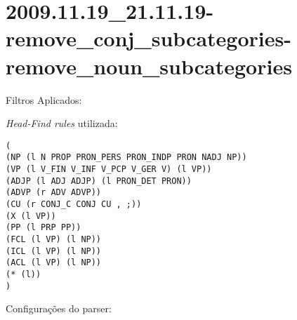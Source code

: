 \section{2009.11.19_21.11.19-remove_conj_subcategories-remove_noun_subcategories} %
\label{sec:exp:2009.11.19_21.11.19-remove_conj_subcategories-remove_noun_subcategories}

Filtros Aplicados:

\begin{itemize}
  
  \item{\emph{RemoveConjSubcategories}
  
  \item{\emph{RemoveNounSubcategories}
  
\end{itemize}

\emph{Head-Find rules} utilizada:

\scriptsize
\begin{verbatim}
(
(NP (l N PROP PRON_PERS PRON_INDP PRON NADJ NP))
(VP (l V_FIN V_INF V_PCP V_GER V) (l VP))
(ADJP (l ADJ ADJP) (l PRON_DET PRON))
(ADVP (r ADV ADVP))
(CU (r CONJ_C CONJ CU , ;))
(X (l VP))
(PP (l PRP PP))
(FCL (l VP) (l NP))
(ICL (l VP) (l NP))
(ACL (l VP) (l NP))
(* (l))
)

\end{verbatim}

\normalsize

Configurações do parser:

